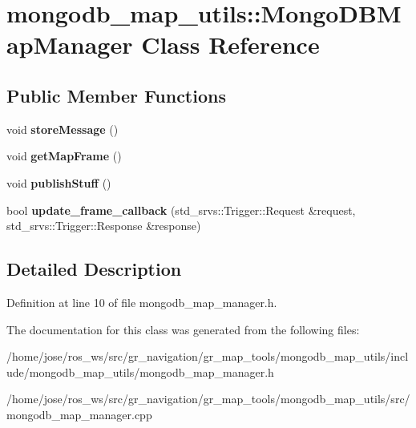 \hypertarget{classmongodb__map__utils_1_1MongoDBMapManager}{}\section{mongodb\+\_\+map\+\_\+utils\+:\+:Mongo\+D\+B\+Map\+Manager Class Reference}
\label{classmongodb__map__utils_1_1MongoDBMapManager}
\subsection*{Public Member Functions}
\begin{DoxyCompactItemize}
\item 
\mbox{\label{classmongodb__map__utils_1_1MongoDBMapManager_a90ce8194041f68a6f0a1a20e69cc77cb}} 
void {\bfseries store\+Message} ()
\item 
\mbox{\label{classmongodb__map__utils_1_1MongoDBMapManager_a32e14cda48839311bf4bd6c065894c6f}} 
void {\bfseries get\+Map\+Frame} ()
\item 
\mbox{\label{classmongodb__map__utils_1_1MongoDBMapManager_a4cd381d2201f8ffbfddf4804aca15911}} 
void {\bfseries publish\+Stuff} ()
\item 
\mbox{\label{classmongodb__map__utils_1_1MongoDBMapManager_ae9f4867ef8d48dbc9df9ff28ea5eeb2d}} 
bool {\bfseries update\+\_\+frame\+\_\+callback} (std\+\_\+srvs\+::\+Trigger\+::\+Request \&request, std\+\_\+srvs\+::\+Trigger\+::\+Response \&response)
\end{DoxyCompactItemize}


\subsection{Detailed Description}


Definition at line 10 of file mongodb\+\_\+map\+\_\+manager.\+h.



The documentation for this class was generated from the following files\+:\begin{DoxyCompactItemize}
\item 
/home/jose/ros\+\_\+ws/src/gr\+\_\+navigation/gr\+\_\+map\+\_\+tools/mongodb\+\_\+map\+\_\+utils/include/mongodb\+\_\+map\+\_\+utils/mongodb\+\_\+map\+\_\+manager.\+h\item 
/home/jose/ros\+\_\+ws/src/gr\+\_\+navigation/gr\+\_\+map\+\_\+tools/mongodb\+\_\+map\+\_\+utils/src/mongodb\+\_\+map\+\_\+manager.\+cpp\end{DoxyCompactItemize}
